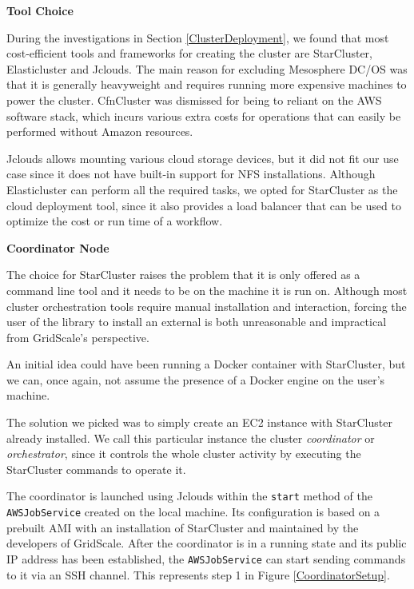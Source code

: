 \textbf{Tool Choice}

During the investigations in Section \ref{ClusterDeployment}, we found that most cost-efficient tools and frameworks for creating the cluster are StarCluster, Elasticluster and Jclouds. The main reason for excluding Mesosphere DC/OS was that it is generally heavyweight and requires running more expensive machines to power the cluster. CfnCluster was dismissed for being to reliant on the AWS software stack, which incurs various extra costs for operations that can easily be performed without Amazon resources.

Jclouds allows mounting various cloud storage devices, but it did not fit our use case since it does not have built-in support for NFS installations. Although Elasticluster can perform all the required tasks, we opted for StarCluster as the cloud deployment tool, since it also provides a load balancer that can be used to optimize the cost or run time of a workflow.

\vspace{3mm}
\textbf{Coordinator Node}
\vspace{1mm}

The choice for StarCluster raises the problem that it is only offered as a command line tool and it needs to be on the machine it is run on. Although most cluster orchestration tools require manual installation and interaction, forcing the user of the library to install an external is both unreasonable and impractical from GridScale's perspective. 

An initial idea could have been running a Docker container with StarCluster, but we can, once again, not assume the presence of a Docker engine on the user's machine.

The solution we picked was to simply create an EC2 instance with StarCluster already installed. We call this particular instance the cluster \textit{coordinator} or \textit{orchestrator}, since it controls the whole cluster activity by executing the StarCluster commands to operate it. 

The coordinator is launched using Jclouds within the \verb|start| method of the \verb|AWSJobService| created on the local machine. Its configuration is based on a prebuilt AMI with an installation of StarCluster and maintained by the developers of GridScale. After the coordinator is in a running state and its public IP address has been established, the \verb|AWSJobService| can start sending commands to it via an SSH channel. This represents step 1 in Figure \ref{CoordinatorSetup}.

